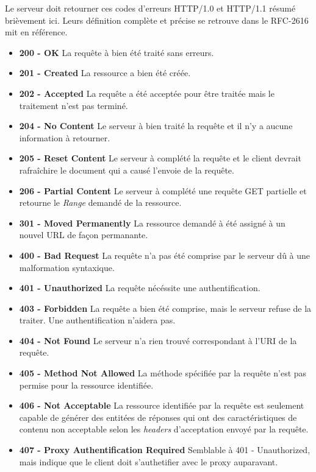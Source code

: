 \documentclass{scrreprt}
\begin{document}
Le serveur doit retourner ces codes d'erreurs HTTP/1.0 et HTTP/1.1 résumé brièvement ici. Leurs définition complète et précise se retrouve dans le RFC-2616 mit en référence. \\
 \begin{itemize}
 \item \textbf{200 - OK}
 \subitem La requête à bien été traité sans erreurs.
 \item \textbf{201 - Created}
 \subitem La ressource a bien été créée.
 \item \textbf{202 - Accepted}
 \subitem La requête a été acceptée pour être traitée mais le traitement n'est pas terminé.
 \item \textbf{204 - No Content}
 \subitem Le serveur à bien traité la requête et il n'y a aucune information à retourner.
 \item \textbf{205 - Reset Content}
 \subitem Le serveur à complété la requête et le client devrait rafraîchire le document qui a causé l'envoie de la requête.
 \item \textbf{206 - Partial Content}
 \subitem Le serveur à complété une requête GET partielle et retourne le \textit{Range} demandé de la ressource.
 \item \textbf{301 - Moved Permanently}
 \subitem La ressource demandé à été assigné à un nouvel URL de façon permanante.
 \item \textbf{400 - Bad Request}
 \subitem La requête n'a pas été comprise par le serveur dû à une malformation syntaxique. 
 \item \textbf{401 - Unauthorized}
 \subitem La requête nécéssite une authentification.
 \item \textbf{403 - Forbidden}
 \subitem La requête a bien été comprise, mais le serveur refuse de la traiter. Une authentification n'aidera pas.
 \item \textbf{404 - Not Found}
 \subitem Le serveur n'a rien trouvé correspondant à l'URI de la requête.
 \item \textbf{405 - Method Not Allowed}
 \subitem La méthode spécifiée par la requête n'est pas permise pour la ressource identifiée.
 \item \textbf{406 - Not Acceptable}
 \subitem La ressource identifiée par la requête est seulement capable de générer des entitées de réponses qui ont des caractéristiques de contenu non acceptable selon les \textit{headers} d'acceptation envoyé par la requête.
 \item \textbf{407 - Proxy Authentification Required}
 \subitem Semblable à 401 - Unauthorized, mais indique que le client doit s'authetifier avec le proxy auparavant.

\end{itemize}
\end{document}
